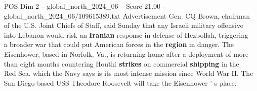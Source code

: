 \begin{textsample}{POS Dim 2 – global\_north\_2024\_06 – Score 21.00 – global\_north\_2024\_06/109615389.txt}
Advertisement Gen.
CQ Brown, chairman of the U.S.
Joint Chiefs of Staff, said Sunday that any Israeli military offensive into Lebanon would risk an \textbf{Iranian} response in defense of Hezbollah, triggering a broader war that could put American forces in the \textbf{region} in danger.
The Eisenhower, based in Norfolk, Va., is returning home after a deployment of more than eight months countering Houthi \textbf{strikes} on commercial \textbf{shipping} in the Red Sea, which the Navy says is its most intense mission since World War II.
The San Diego-based USS Theodore Roosevelt will take the Eisenhower ' s place.

\end{textsample}
